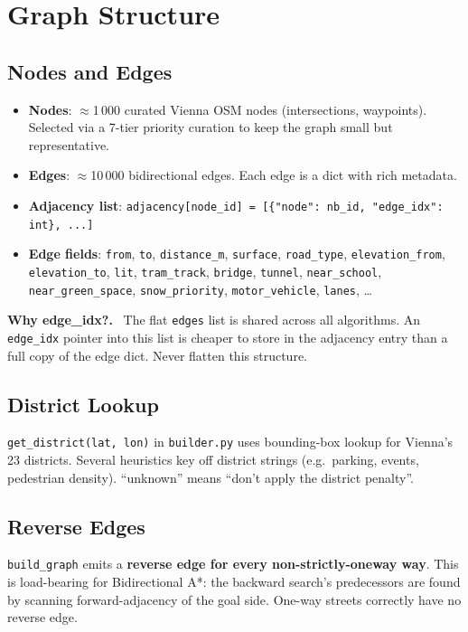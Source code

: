 \documentclass[11pt,a4paper]{article}
\newenvironment{notebox}[1][Note]{%
  \begin{mdframed}[backgroundcolor=notebox,linecolor=blue!40,linewidth=1pt]%
  \textbf{#1.}\ }{\end{mdframed}}
\begin{document}
\section{Graph Structure}

\subsection{Nodes and Edges}
\begin{itemize}[noitemsep]
  \item \textbf{Nodes}: $\approx$1\,000 curated Vienna OSM nodes (intersections, waypoints). Selected via a 7-tier priority curation to keep the graph small but representative.
  \item \textbf{Edges}: $\approx$10\,000 bidirectional edges. Each edge is a dict with rich metadata.
  \item \textbf{Adjacency list}: \texttt{adjacency[node\_id] = [\{"node": nb\_id, "edge\_idx": int\}, ...]}
  \item \textbf{Edge fields}: \texttt{from}, \texttt{to}, \texttt{distance\_m}, \texttt{surface}, \texttt{road\_type}, \texttt{elevation\_from}, \texttt{elevation\_to}, \texttt{lit}, \texttt{tram\_track}, \texttt{bridge}, \texttt{tunnel}, \texttt{near\_school}, \texttt{near\_green\_space}, \texttt{snow\_priority}, \texttt{motor\_vehicle}, \texttt{lanes}, \ldots
\end{itemize}

\begin{notebox}[Why edge\_idx?]
The flat \texttt{edges} list is shared across all algorithms. An \texttt{edge\_idx} pointer into this list is cheaper to store in the adjacency entry than a full copy of the edge dict. Never flatten this structure.
\end{notebox}

\subsection{District Lookup}
\texttt{get\_district(lat, lon)} in \texttt{builder.py} uses bounding-box lookup for Vienna's 23 districts.
Several heuristics key off district strings (e.g.\ parking, events, pedestrian density).
``unknown'' means ``don't apply the district penalty''.

\subsection{Reverse Edges}
\texttt{build\_graph} emits a \textbf{reverse edge for every non-strictly-oneway way}. This is load-bearing
for Bidirectional A*: the backward search's predecessors are found by scanning forward-adjacency of
the goal side. One-way streets correctly have no reverse edge.
\end{document}
